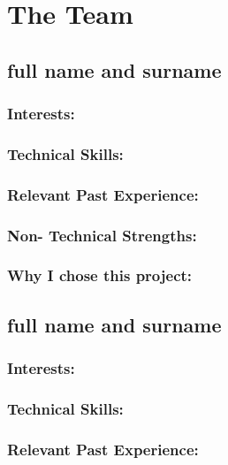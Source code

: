 \section{The Team}

\subsection{full name and surname}

\subsubsection{Interests:}

\subsubsection{Technical Skills:}

\subsubsection{Relevant Past Experience:}

\subsubsection{Non- Technical Strengths:}

\subsubsection{Why I chose this project:}

\newpage
\subsection{full name and surname}

\subsubsection{Interests:}

\subsubsection{Technical Skills:}

\subsubsection{Relevant Past Experience:}

